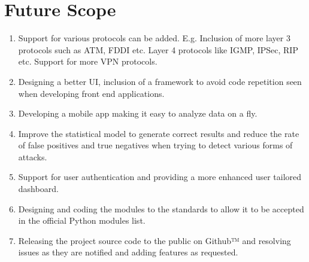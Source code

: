 \chapter{Future Scope}
{
	\begin{enumerate}
		\item Support for various protocols can be added. E.g. Inclusion of more layer 3 protocols such as ATM, FDDI etc. Layer 4 protocols like IGMP, IPSec, RIP etc. Support for more VPN protocols.
		\item Designing a better UI, inclusion of a framework to avoid code repetition seen when developing front end applications.
		\item Developing a mobile app making it easy to analyze data on a fly.
		\item Improve the statistical model to generate correct results and reduce the rate of false positives and true negatives when trying to detect various forms of attacks.
		\item Support for user authentication and providing a more enhanced user tailored dashboard.
		\item Designing and coding the modules to the standards to allow it to be accepted in the official Python modules list.
		\item Releasing the project source code to the public on Github™ and resolving issues as they are notified and adding features as requested. 
		
	\end{enumerate}
}